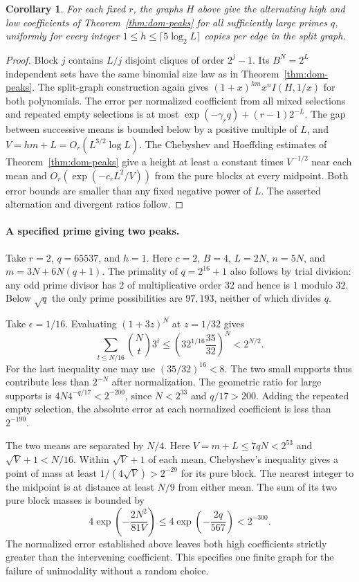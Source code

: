 \documentclass[11pt,a4paper]{article}
\newtheorem{corollary}[theorem]{Corollary}
\begin{document}
\begin{corollary}\label{cor:projective-peaks}
For each fixed $r$, the graphs $H$ above give the alternating high and
low coefficients of Theorem~\ref{thm:dom-peaks} for all sufficiently
large primes $q$, uniformly for every integer
$1\le h\le\lceil5\log_2 L\rceil$ copies per edge in the split graph.
\end{corollary}
\begin{proof}
Block $j$ contains $L/j$ disjoint cliques of order $2^j-1$. Its $B^N=2^L$
independent sets have the same binomial size law as in
Theorem~\ref{thm:dom-peaks}. The split-graph construction again gives
$(1+x)^{hm}x^nI(H,1/x)$ for both polynomials. The error per normalized
coefficient from all mixed selections and repeated empty selections is
at most $\exp(-\gamma_r q)+(r-1)2^{-L}$. The gap between successive
means is bounded below by a positive multiple of $L$, and
$V=hm+L=O_r(L^{3/2}\log L)$. The Chebyshev and Hoeffding estimates of
Theorem~\ref{thm:dom-peaks} give a height at least a constant times
$V^{-1/2}$ near each mean and $O_r(\exp(-c_r L^2/V))$ from the pure
blocks at every midpoint. Both error bounds are smaller than any fixed
negative power of $L$. The asserted alternation and divergent ratios follow.
\end{proof}

\paragraph{A specified prime giving two peaks.}
Take $r=2$, $q=65537$, and $h=1$. Here $c=2$, $B=4$, $L=2N$,
$n=5N$, and $m=3N+6N(q+1)$. The primality of $q=2^{16}+1$ also
follows by trial division: any odd prime divisor has $2$ of multiplicative
order $32$ and hence is $1$ modulo $32$. Below $\sqrt q$ the only prime
possibilities are $97,193$, neither of which divides $q$.

Take $\epsilon=1/16$. Evaluating $(1+3z)^N$ at $z=1/32$ gives
\[
 \sum_{t\le N/16}\binom Nt3^t
   \le \left(32^{1/16}\frac{35}{32}\right)^N <2^{N/2}.
\]
For the last inequality one may use $(35/32)^{16}<8$.
The two small supports thus contribute less than $2^{-N}$ after
normalization. The geometric ratio for large supports is
$4N4^{-q/17}<2^{-200}$, since $N<2^{33}$ and $q/17>200$.
Adding the repeated empty selection, the absolute error at each normalized
coefficient is less than $2^{-190}$.

The two means are separated by $N/4$. Here $V=m+L\le7qN<2^{53}$
and $\sqrt V+1<N/16$. Within $\sqrt V+1$ of each mean, Chebyshev's
inequality gives a point of mass at least $1/(4\sqrt V)>2^{-29}$ for
its pure block. The nearest integer to the midpoint is at distance
at least $N/9$ from either mean. The sum of its two pure block masses
is bounded by
\[
 4\exp\!\left(-\frac{2N^2}{81V}\right)
 \le 4\exp\!\left(-\frac{2q}{567}\right)<2^{-300}.
\]
The normalized error established above leaves both high coefficients
strictly greater than the intervening coefficient. This specifies one
finite graph for the failure of unimodality without a random choice.
\end{document}
